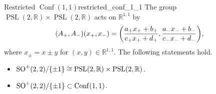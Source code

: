 \documentclass{article}
\begin{document}
\begin{proposition}{Restricted $\operatorname{Conf}(1,1)$}{restricted_conf_1_1}
    The group $\operatorname{PSL}(2,\mathbb{R})\times \operatorname{PSL}(2,\mathbb{R})$ acts on $\mathbb{R}^{1,1}$ by
    \[ (A_+,A_-)(x_+,x_-) = \qty(\frac{a_+ x_+ + b_+}{c_+ x_+ + d_+}, \frac{a_- x_- + b_-}{c_- x_- + d_-}), \]
    where $x_\pm = x\pm y$ for $(x,y)\in\mathbb{R}^{1,1}$.
    The following statements hold.
    \begin{itemize}
        \item $\operatorname{SO}^+(2,2)/\qty{\pm 1} \cong \operatorname{PSL}(2,\mathbb{R})\times \operatorname{PSL}(2,\mathbb{R})$.
        \item $\operatorname{SO}^+(2,2)/\qty{\pm 1} \subset \operatorname{Conf}(1,1)$.
    \end{itemize}
\end{proposition}

% 
% 
\end{document}
